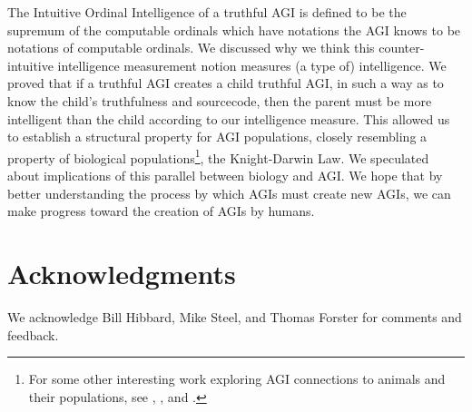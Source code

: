 \documentclass[runningheads]{llncs}
\begin{document}
The Intuitive Ordinal Intelligence of a truthful AGI is defined to be the supremum of the
computable ordinals which have notations the AGI knows to be notations of
computable ordinals. We discussed why we think this counter-intuitive intelligence
measurement notion measures (a type of) intelligence.
We proved that if a truthful AGI creates
a child truthful AGI, in such a way as to know the child's truthfulness and sourcecode,
then the parent must be more intelligent than the child according
to our intelligence measure. This allowed us to establish a structural
property for AGI populations,
closely resembling a property of biological populations\footnote{For
some other interesting work exploring AGI connections to animals and their
populations,
see \cite{beyret2019animal}, \cite{strannegaard2018learning},
and \cite{yoshida2017homeostatic}.}, the Knight-Darwin
Law. We speculated about implications of this parallel between biology and
AGI.
We hope that by better understanding
the process by which AGIs must create new AGIs, we can make progress toward the
creation of AGIs by humans.

\section*{Acknowledgments}

We acknowledge Bill Hibbard, Mike Steel, and Thomas Forster for comments and feedback.



\end{document}
